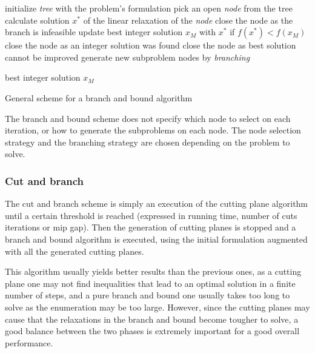 \begin{algorithm}
\begin{algorithmic}

\STATE initialize \textit{tree} with the problem's formulation
\STATE 
{}
	\STATE pick an open \textit{node} from the tree
	\STATE calculate solution $x^*$ of the linear relaxation of the \textit{node}
		\STATE close the node as the branch is infeasible
		\STATE update best integer solution $x_M$ with $x^*$ if $f(x^*) < f(x_M)$
		\STATE close the node as an integer solution was found
		\STATE close the node as best solution cannot be improved
	\ELSE
		\STATE generate new subproblem nodes by \textit{branching}
	\ENDIF
\ENDWHILE

\RETURN best integer solution $x_M$

\end{algorithmic}

\caption{General scheme for a branch and bound algorithm}
\label{alg:branchnbound}

\end{algorithm}

The branch and bound scheme does not specify which node to select on each iteration, or how to generate the subproblems on each node. The node selection strategy and the branching strategy are chosen depending on the problem to solve.

\subsubsection{Cut and branch}

The cut and branch scheme is simply an execution of the cutting plane algorithm until a certain threshold is reached (expressed in running time, number of cuts iterations or mip gap). Then the generation of cutting planes is stopped and a branch and bound algorithm is executed, using the initial formulation augmented with all the generated cutting planes.

This algorithm usually yields better results than the previous ones, as a cutting plane one may not find inequalities that lead to an optimal solution in a finite number of steps, and a pure branch and bound one usually takes too long to solve as the enumeration may be too large. However, since the cutting planes may cause that the relaxations in the branch and bound become tougher to solve, a good balance between the two phases is extremely important for a good overall performance.

